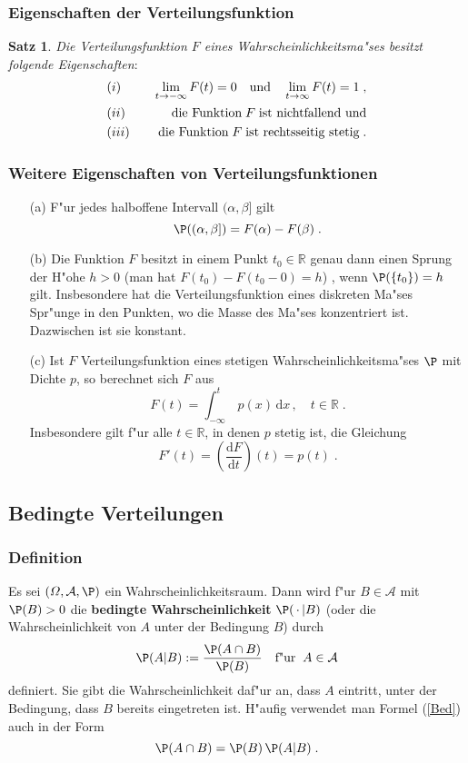 \documentclass[ngerman,draft,parskip=half,twoside]{scrartcl}
\newtheorem{thm}{Satz}[section]
\newcommand*{\R}{\mathbb{R}}      %
\newcommand*{\Algeb}{\mathcal{A}}   %
\begin{document}
\subsubsection{Eigenschaften der Verteilungsfunktion}
\begin{thm}
\label{VF}
Die Verteilungsfunktion $F$ eines Wahrscheinlichkeitsma"ses besitzt folgende Eigenschaften$\colon$
\begin{eqnarray*}
&(i)&\quad\lim_{t\to -\infty} F(t)=0\quad\mbox{\rm und}\quad\lim_{t\to\infty} F(t)=1\;,\\
&(ii)&\quad\mbox{\rm die Funktion}\; F\;\mbox{\rm ist nichtfallend und}\\
&(iii)&\quad\mbox{\rm die Funktion}\;
F\;\mbox{\rm ist rechtsseitig stetig}\;.
\end{eqnarray*}
\end{thm}
\subsubsection{Weitere Eigenschaften von Verteilungsfunktionen}
\begin{enumerate}
\item[(a)]
F"ur jedes halboffene Intervall $(\alpha,\beta]$ gilt
$$
\P((\alpha,\beta])= F(\alpha)-F(\beta)\;.
$$
\item[(b)]
Die Funktion $F$ besitzt in einem Punkt $t_0\in\R$ genau dann einen Sprung der H"ohe
$h>0$ (man hat $F(t_0)-F(t_0-0)=h$) , wenn $\P(\{t_0\})=h$ gilt. Insbesondere hat die
Verteilungsfunktion eines diskreten Ma"ses Spr"unge in den Punkten, wo die Masse
des Ma"ses konzentriert ist. Dazwischen ist sie konstant.
\item[(c)]
Ist $F$ Verteilungsfunktion eines stetigen Wahrscheinlichkeitsma"ses $\P$ mit Dichte $p$, so berechnet
sich $F$ aus
$$
F(t)=\int_{-\infty}^t\,p(x)\,\mathrm d x\,,\quad t\in\R\;.
$$
Insbesondere gilt f"ur alle $t\in\R$, in denen $p$ stetig ist, die Gleichung
$$
F'(t)=\left(\frac{\mathrm d F}{\mathrm d t} \right)(t)= p(t)\;.
$$
\end{enumerate}
\subsection{Bedingte Verteilungen}
\subsubsection{Definition}
Es sei $(\Omega,\Algeb,\P)$ ein Wahrscheinlichkeitsraum. Dann wird
f"ur $B\in \Algeb$ mit $\P(B)>0$ die \textbf{bedingte Wahrscheinlichkeit} $\P(\,\cdot\,|B)$
(oder die Wahrscheinlichkeit von $A$ unter der Bedingung $B$)
durch
\begin{equation}
\label{Bed}
 \P(A|B):=\frac{\P(A\cap B)}{\P(B)}\quad\mbox{f"ur}\;\;A\in\Algeb
\end{equation}
definiert. Sie gibt die Wahrscheinlichkeit daf"ur an, dass $A$
eintritt, unter der Bedingung, dass $B$ bereits eingetreten ist. H"aufig verwendet man
Formel (\ref{Bed}) auch in der Form
$$
\P(A\cap B)= \P(B)\,\P(A|B)\;.
$$
\end{document}
